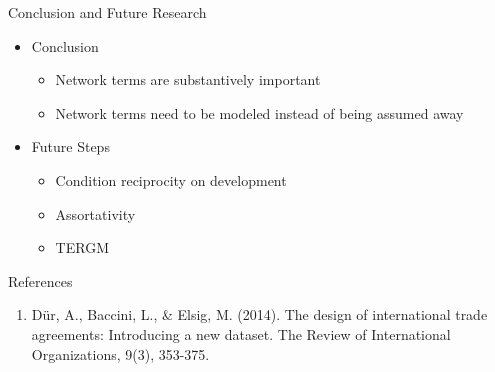 \documentclass{beamer}
\begin{document}
\begin{frame}{Conclusion and Future Research}

\begin{itemize}
\item{Conclusion}
\begin{itemize}
\item{Network terms are substantively important}
\item{Network terms need to be modeled instead of being assumed away}
\end{itemize}
\item{Future Steps}
\begin{itemize}
\item{Condition reciprocity on development}
\item{Assortativity}
\item{TERGM}
\end{itemize}
\end{itemize}


\end{frame}


\begin{frame}{References}
\begin{enumerate}
\item{D{\"u}r, A., Baccini, L., \& Elsig, M. (2014). The design of international trade agreements: Introducing a new dataset. The Review of International Organizations, 9(3), 353-375.}
\end{enumerate}
\end{frame}
\end{document}
